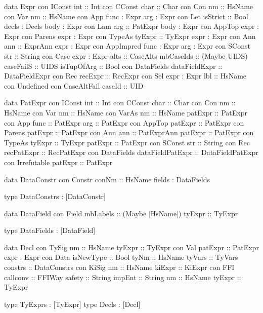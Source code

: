 \begin{code}
data Expr
  con IConst
    int           :: Int
  con CConst
    char          :: Char
  con Con
    nm            :: HsName
  con Var
    nm            :: HsName
  con App
    func          :  Expr
    arg           :  Expr
  con Let
    isStrict      :: Bool
    decls         :  Decls
    body          :  Expr
  con Lam
    arg           :: PatExpr
    body          :  Expr
  con AppTop
    expr          :  Expr
  con Parens
    expr          :  Expr
  con TypeAs
    tyExpr        :: TyExpr
    expr          :  Expr
  con Ann
    ann           :: ExprAnn
    expr          :  Expr
  con AppImpred
    func          :  Expr
    arg           :  Expr
  con SConst 
    str           :: String
  con Case
    expr          :  Expr
    alts          :: CaseAlts
    mbCaseIds     :: (Maybe UIDS)
    caseFailS     :: UIDS
    isTupOfArg    :: Bool
  con DataFields
    dataFieldExpr :: DataFieldExpr
  con Rec
    recExpr       :: RecExpr
  con Sel
    expr          :  Expr
    lbl           :: HsName
  con Undefined
  con CaseAltFail 
    caseId        :: UID
    
data PatExpr
  con IConst
    int              :: Int
  con CConst
    char             :: Char
  con Con
    nm               :: HsName
  con Var
    nm               :: HsName
  con VarAs
    nm               :: HsName
    patExpr          :: PatExpr
  con App
    func             :: PatExpr
    arg              :: PatExpr
  con AppTop
    patExpr          :: PatExpr
  con Parens
    patExpr          :: PatExpr
  con Ann
    ann              :: PatExprAnn
    patExpr          :: PatExpr
  con TypeAs
    tyExpr           :: TyExpr
    patExpr          :: PatExpr
  con SConst
    str              :: String
  con Rec
    recPatExpr       :: RecPatExpr
  con DataFields
    dataFieldPatExpr :: DataFieldPatExpr
  con Irrefutable
    patExpr          :: PatExpr

data DataConstr
  con Constr
    conNm      :: HsName
    fields     :  DataFields
    
type DataConstrs : [DataConstr]

data DataField
  con Field
    mbLabels     :: (Maybe [HsName])
    tyExpr       :: TyExpr
    
type DataFields : [DataField]

data Decl
  con TySig
    nm         :: HsName
    tyExpr     :: TyExpr
  con Val
    patExpr    :: PatExpr
    expr       :  Expr
  con Data
    isNewType  :: Bool
    tyNm       :: HsName
    tyVars     :: TyVars
    constrs    :: DataConstrs
  con KiSig
    nm         :: HsName
    kiExpr     :: KiExpr
  con FFI
    callconv   :: FFIWay
    safety     :: String
    impEnt     :: String
    nm         :: HsName
    tyExpr     :: TyExpr
  
type TyExprs : [TyExpr]
type Decls   : [Decl]
\end{code}

